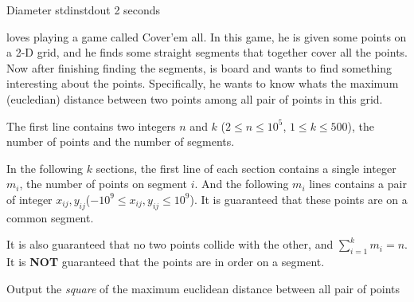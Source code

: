 \begin{problem}{Diameter}
{stdin}{stdout}
{2 seconds}{}{}

\pittoresque loves playing a game called Cover'em all. In this game, he is given some points on a 2-D grid, and he finds some straight segments that together cover all the points. Now after finishing finding the segments, \pittoresque is board and wants to find something interesting about the points. Specifically, he wants to know whats the maximum (eucledian) distance between two points among all pair of points in this grid.

\InputFile

The first line contains two integers $n$ and $k$ ($2 \le n \le 10^5$, $1 \le k \le 500$), the number of points and the number of segments.

In the following $k$ sections, the first line of each section contains a single integer $m_i$, the number of points on segment $i$. And the following $m_i$ lines contains a pair of integer $x_{ij}, y_{ij}$($-10^9 \le x_{ij}, y_{ij} \le 10^9$). It is guaranteed that these points are on a common segment.

It is also guaranteed that no two points collide with the other, and $\sum_{i = 1}^{k} m_i = n$. It is \textbf{NOT} guaranteed that the points are in order on a segment.

\OutputFile

Output the \textit{square} of the maximum  euclidean distance between all pair of points

\Examples

\begin{example}
%
\end{example}

\begin{example}
%
\end{example}



\end{problem}